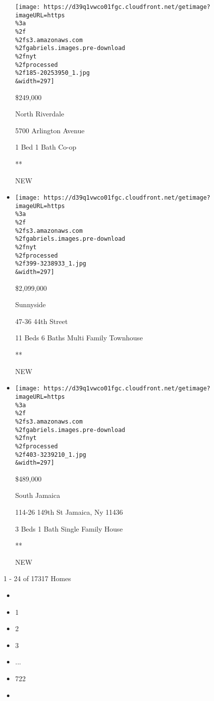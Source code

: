 \begin{itemize}
  \texttt{[image: https://d39q1vwco01fgc.cloudfront.net/getimage?imageURL=https\\\%3a\\\%2f\\\%2fs3.amazonaws.com\\\%2fgabriels.images.pre-download\\\%2fnyt\\\%2fprocessed\\\%2f185-20253950\_1.jpg\\\&width=297]}

  \$249,000

  North Riverdale

  5700 Arlington Avenue

  1 Bed \textbar{} 1 Bath \textbar{} Co-op

  **

  NEW
\item
  \href{/real-estate/usa/ny/queens/sunnyside/homes-for-sale/47-36-44th-street/399-3238933?}{}

  \texttt{[image: https://d39q1vwco01fgc.cloudfront.net/getimage?imageURL=https\\\%3a\\\%2f\\\%2fs3.amazonaws.com\\\%2fgabriels.images.pre-download\\\%2fnyt\\\%2fprocessed\\\%2f399-3238933\_1.jpg\\\&width=297]}

  \$2,099,000

  Sunnyside

  47-36 44th Street

  11 Beds \textbar{} 6 Baths \textbar{} Multi Family Townhouse

  **

  NEW
\item
  \href{/real-estate/usa/ny/queens/south-jamaica/homes-for-sale/114-26-149th-st-jamaica-ny-11436/403-3239210?}{}

  \texttt{[image: https://d39q1vwco01fgc.cloudfront.net/getimage?imageURL=https\\\%3a\\\%2f\\\%2fs3.amazonaws.com\\\%2fgabriels.images.pre-download\\\%2fnyt\\\%2fprocessed\\\%2f403-3239210\_1.jpg\\\&width=297]}

  \$489,000

  South Jamaica

  114-26 149th St Jamaica, Ny 11436

  3 Beds \textbar{} 1 Bath \textbar{} Single Family House

  **

  NEW
\end{itemize}

1 - 24 of 17317 Homes

\begin{itemize}
\item
\item
  1
\item
  2
\item
  3
\item
  ...
\item
  722
\item
\end{itemize}

